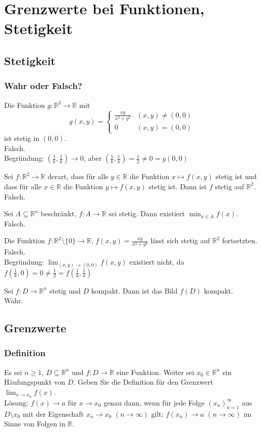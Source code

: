 \section{Grenzwerte bei Funktionen, Stetigkeit}
\subsection{Stetigkeit}
\subsubsection{Wahr oder Falsch?}
Die Funktion $g : \mathbb{R}^2 \to \mathbb{R}$ mit
\begin{displaymath}
g(x,y) =
\begin{cases}
\frac{xy}{x^2 + y^2}& (x,y) \neq (0,0)\\
0& (x,y) = (0,0)
\end{cases}
\end{displaymath}
ist stetig in $(0,0)$.\\
Falsch.\\
Begründung: $\left(\frac{1}{k}, \frac{1}{k}\right) \to 0$, aber $\left(\frac{1}{k}, \frac{1}{k}\right) = \frac{1}{2} \neq 0 = g(0,0)$

Sei $f: \mathbb{R}^2 \to \mathbb{R}$ derart, dass für alle $y \in \mathbb{R}$ die Funktion $x \mapsto f(x,y)$ stetig ist und dass für alle $x \in \mathbb{R}$ die Funktion $y \mapsto f(x,y)$ stetig ist.
Dann ist $f$ stetig auf $\mathbb{R}^2$.\\
Falsch.

Sei $A \subseteq \mathbb{R}^n$ beschränkt, $f : A \to \mathbb{R}$ sei stetig.
Dann existiert $\min_{x \in A} f(x)$.\\
Falsch.

Die Funktion $f : \mathbb{R}^2 \setminus \{0\} \to \mathbb{R}$, $f(x,y) = \frac{xy}{x^2 + y^2}$ lässt sich stetig auf $\mathbb{R}^2$ fortsetzten.\\
Falsch.\\
Begründung: $\lim_{(x,y) \to (0,0)} f(x,y)$ existiert nicht, da $f\left(\frac{1}{k}, 0\right) = 0 \neq \frac{1}{2} = f\left(\frac{1}{k}, \frac{1}{k}\right)$

Sei $f:D \to \mathbb{R}^n$ stetig und $D$ kompakt.
Dann ist das Bild $f(D)$ kompakt.\\
Wahr.

\subsection{Grenzwerte}
\subsubsection{Definition}
Es sei $n \geq 1$, $D \subseteq \mathbb{R}^n$ und $f : D \to \mathbb{R}$ eine Funktion.
Weiter sei $x_0 \in \mathbb{R}^n$ ein Häufungspunkt von $D$.
Geben Sie die Definition für den Grenzwert $\lim_{x \to x_0} f(x)$.\\
Lösung:
$f(x) \to a$ für $x \to x_0$ genau dann, wenn für jede Folge $(x_n)_{n = 1}^{\infty}$ aus $D \setminus x_0$ mit der Eigenschaft $x_n \to x_0$ $(n \to \infty)$ gilt:
$f(x_n) \to a$ $(n \to \infty)$ im Sinne von Folgen in $\mathbb{R}$.

